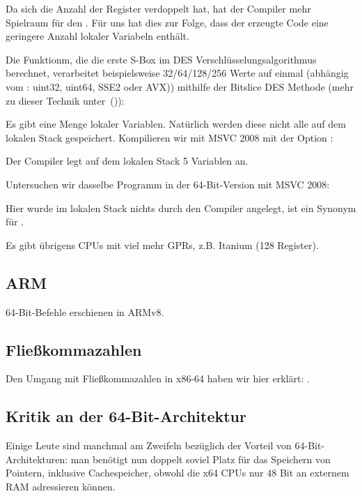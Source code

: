 Da sich die Anzahl der Register verdoppelt hat, hat der Compiler mehr Spielraum für den .
Für uns hat dies zur Folge, dass der erzeugte Code eine geringere Anzahl lokaler Variabeln enthält.

Die Funktionm, die die erste S-Box im DES Verschlüsselungsalgorithmus berechnet, verarbeitet beispielsweise
32/64/128/256 Werte auf einmal (abhängig vom : uint32, uint64, SSE2 oder AVX)) mithilfe der Bitslice DES
Methode (mehr zu dieser Technik unter~()):


Es gibt eine Menge lokaler Variablen.
Natürlich werden diese nicht alle auf dem lokalen Stack gespeichert.
Kompilieren wir mit MSVC 2008 mit der Option :


Der Compiler legt auf dem lokalen Stack 5 Variablen an.

Untersuchen wir dasselbe Programm in der 64-Bit-Version mit MSVC 2008:


Hier wurde im lokalen Stack nichts durch den Compiler angelegt,  ist ein Synonym für .

\iffalse
Wir sehen hier übrigens, dass die Funktion die Register \RCX und \RDX in vom Aufrufenden bereitgestellten Speicherplatz
gesichert hat. \Reg{8} und \Reg{9} wurden nicht gesichert, aber trotzdem von Beginn an benutzt.

\fi

Es gibt übrigens CPUs mit viel mehr \ac{GPR}s, z.B. Itanium (128 Register).

\subsection{ARM}

64-Bit-Befehle erschienen in ARMv8.

\subsection{Fließkommazahlen}
Den Umgang mit Fließkommazahlen in x86-64 haben wir hier erklärt: .

\subsection{Kritik an der 64-Bit-Architektur}
Einige Leute sind manchmal am Zweifeln bezüglich der Vorteil von 64-Bit-Architekturen: man benötigt nun doppelt soviel
Platz für das Speichern von Pointern, inklusive Cachespeicher, obwohl die x64 CPUs nur 48 Bit an externem \ac{RAM}
adressieren können.

